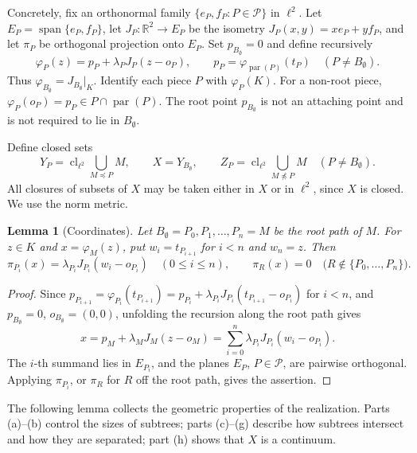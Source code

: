 \documentclass[11pt]{amsart}
\newtheorem{lemma}[theorem]{Lemma}
\theoremstyle{definition}
\theoremstyle{remark}
\newcommand{\pa}{\operatorname{par}}
\newcommand{\Pc}{\mathcal{P}}
\newcommand{\R}{\mathbb{R}}
\begin{document}
Concretely, fix an orthonormal family $\{e_P,f_P:P\in\Pc\}$ in $\ell^2$. Let $E_P=\operatorname{span}\{e_P,f_P\}$, let $J_P\colon\R^2\to E_P$ be the isometry $J_P(x,y)=xe_P+yf_P$, and let $\pi_P$ be orthogonal projection onto $E_P$. Set $p_{B_\emptyset}=0$ and define recursively
\[
\varphi_P(z)=p_P+\lambda_PJ_P(z-o_P),\qquad p_P=\varphi_{\pa(P)}(t_P)\quad(P\neq B_\emptyset).
\]
Thus $\varphi_{B_\emptyset}=J_{B_\emptyset}|_K$. Identify each piece $P$ with $\varphi_P(K)$. For a non-root piece, $\varphi_P(o_P)=p_P\in P\cap\pa(P)$. The root point $p_{B_\emptyset}$ is not an attaching point and is not required to lie in $B_\emptyset$.

Define closed sets
\[
Y_P=\operatorname{cl}_{\ell^2}\bigcup_{M\preceq P}M,\qquad X=Y_{B_\emptyset},\qquad Z_P=\operatorname{cl}_{\ell^2}\bigcup_{M\not\preceq P}M\quad(P\neq B_\emptyset).
\]
All closures of subsets of $X$ may be taken either in $X$ or in $\ell^2$, since $X$ is closed. We use the norm metric.

\begin{lemma}[Coordinates]\label{lem:coordinates}
Let $B_\emptyset=P_0,P_1,\ldots,P_n=M$ be the root path of $M$. For $z\in K$ and $x=\varphi_M(z)$, put $w_i=t_{P_{i+1}}$ for $i<n$ and $w_n=z$. Then
\[
\pi_{P_i}(x)=\lambda_{P_i}J_{P_i}(w_i-o_{P_i})\quad(0\le i\le n),\qquad \pi_R(x)=0\quad\bigl(R\notin\{P_0,\ldots,P_n\}\bigr).
\]
\end{lemma}

\begin{proof}
Since $p_{P_{i+1}}=\varphi_{P_i}(t_{P_{i+1}})=p_{P_i}+\lambda_{P_i}J_{P_i}(t_{P_{i+1}}-o_{P_i})$ for $i<n$, and $p_{B_\emptyset}=0$, $o_{B_\emptyset}=(0,0)$, unfolding the recursion along the root path gives
\[
x=p_M+\lambda_MJ_M(z-o_M)=\sum_{i=0}^{n}\lambda_{P_i}J_{P_i}(w_i-o_{P_i}).
\]
The $i$-th summand lies in $E_{P_i}$, and the planes $E_P$, $P\in\Pc$, are pairwise orthogonal. Applying $\pi_{P_i}$, or $\pi_R$ for $R$ off the root path, gives the assertion.
\end{proof}

The following lemma collects the geometric properties of the realization. Parts (a)--(b) control the sizes of subtrees; parts (c)--(g) describe how subtrees intersect and how they are separated; part (h) shows that $X$ is a continuum.
\end{document}
